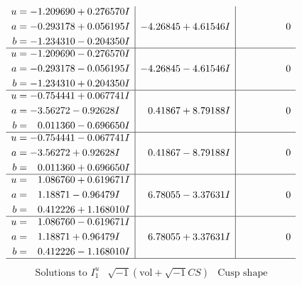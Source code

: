 \documentclass[1p]{elsarticle_modified}
\theoremstyle{definition}
\newcommand{\I}{\sqrt{-1}}
\begin{document}
$$\begin{array}{c|c|c}
\begin{aligned}
u &= -1.209690 + 0.276570 I \\
a &= -0.293178 + 0.056195 I \\
b &= -1.234310 - 0.204350 I\end{aligned}
 & -4.26845 + 4.61546 I & \phantom{-0.000000 } 0 \\ \hline\begin{aligned}
u &= -1.209690 - 0.276570 I \\
a &= -0.293178 - 0.056195 I \\
b &= -1.234310 + 0.204350 I\end{aligned}
 & -4.26845 - 4.61546 I & \phantom{-0.000000 } 0 \\ \hline\begin{aligned}
u &= -0.754441 + 0.067741 I \\
a &= -3.56272 - 0.92628 I \\
b &= \phantom{-}0.011360 - 0.696650 I\end{aligned}
 & \phantom{-}0.41867 + 8.79188 I & \phantom{-0.000000 } 0 \\ \hline\begin{aligned}
u &= -0.754441 - 0.067741 I \\
a &= -3.56272 + 0.92628 I \\
b &= \phantom{-}0.011360 + 0.696650 I\end{aligned}
 & \phantom{-}0.41867 - 8.79188 I & \phantom{-0.000000 } 0 \\ \hline\begin{aligned}
u &= \phantom{-}1.086760 + 0.619671 I \\
a &= \phantom{-}1.18871 - 0.96479 I \\
b &= \phantom{-}0.412226 + 1.168010 I\end{aligned}
 & \phantom{-}6.78055 - 3.37631 I & \phantom{-0.000000 } 0 \\ \hline\begin{aligned}
u &= \phantom{-}1.086760 - 0.619671 I \\
a &= \phantom{-}1.18871 + 0.96479 I \\
b &= \phantom{-}0.412226 - 1.168010 I\end{aligned}
 & \phantom{-}6.78055 + 3.37631 I & \phantom{-0.000000 } 0\\
 \hline 
 \end{array}$$\newpage$$\begin{array}{c|c|c}  
\text{Solutions to }I^u_{1}& \I (\text{vol} + \sqrt{-1}CS) & \text{Cusp shape}\\
 \hline 
\begin{aligned}

\end{aligned}
\end{array}$$
\end{document}
